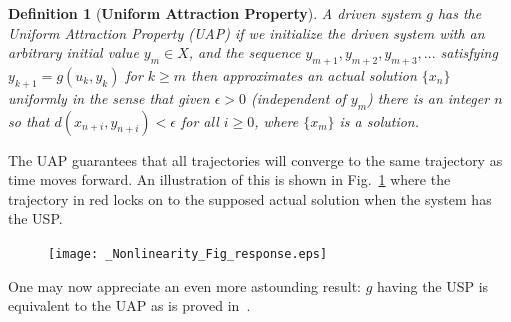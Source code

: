 \documentclass[a4paper,12pt,twoside]{report}
\newtheorem{Definition}{Definition}[]
\newtheorem{Theorem}{Theorem}[]
\begin{document}
\begin{Definition}
  [\bf Uniform Attraction Property]\label{Dfn_UAP}\rm
  A driven system $g$ has the Uniform Attraction Property (UAP) if we initialize the driven system
with an arbitrary initial value $y_m \in X$, and the sequence $y_{m+1}, y_{m+2}, y_{m+3},...$ satisfying $y_{k+1}= g(u_k,y_k)$ for $k \geq m$ then approximates an actual solution $\{x_n\}$ uniformly in the sense that given $\epsilon>0$ (independent of $y_m$) there is an integer $n$ so that $d(x_{n+i}, y_{n+i})<\epsilon$ for all $i\ge 0$, where $\{x_m\}$ is a solution.
\end{Definition}

The UAP guarantees that all trajectories will converge to the same trajectory as time moves forward. An illustration of this is shown in Fig.~\ref{fig:memloss_conttime} where the trajectory in red locks on to the supposed actual solution when the system has the USP.

\begin{figure}[ht]
  \texttt{[image: \_Nonlinearity\_Fig\_response.eps]}
  \centering
{}
\label{fig:memloss_conttime} 
\end{figure} 

One may now appreciate an even more astounding result: $g$ having the USP is equivalent to the UAP as is proved in~\cite{Manju_Nonlinearity}.



\end{document}

